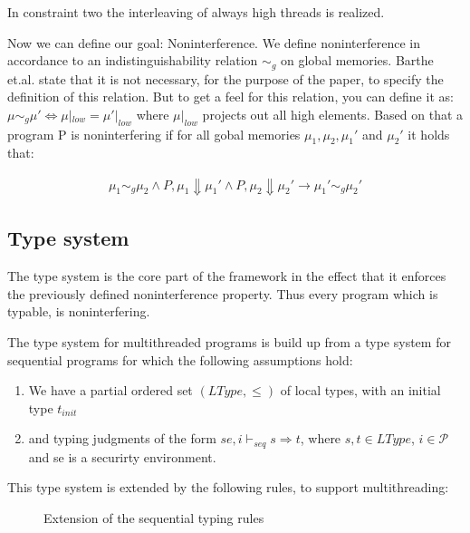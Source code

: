 \documentclass[a4paper,10pt]{llncs}
\begin{document}
In constraint two the interleaving of always high threads is realized.


Now we can define our goal: Noninterference. We define noninterference
in accordance to an indistinguishability relation $\sim_g$ on global memories.
Barthe et.al. state that it is not necessary, for the purpose of the paper,
to specify the definition of this relation. But to get a feel for this
relation, you can define it as: $\mu \sim_g \mu' \Leftrightarrow \mu|_{low} =
\mu'|_{low}$ where $\mu|_{low}$ projects out all high elements. Based on that
a program P is noninterfering if for all gobal memories $\mu_1, \mu_2, \mu_1'$
and $\mu_2'$ it holds that:

\begin{align*}
\mu_1 \sim_g \mu_2 \land P,\mu_1 \Downarrow \mu_1' \land P,\mu_2 \Downarrow \mu_2' \rightarrow \mu_1' \sim_g \mu_2'
\end{align*}

\subsection{Type system}
\label{sec:typesystem}
The type system is the core part of the framework in the effect that it
enforces the previously defined noninterference property. Thus every
program which is typable, is noninterfering.

The type system for multithreaded programs is build up from a type system
for sequential programs for which the following assumptions hold:

\begin{enumerate}
\item We have a partial ordered set $(LType, \leq)$ of local types, with an initial
      type $t_{init}$
\item and typing judgments of the form $se, i \vdash_{seq} s \Rightarrow t$, where
      $s, t \in LType$, $i \in \mathcal{P}$ and se is a securirty environment.
\end{enumerate}

This type system is extended by the following rules, to support multithreading:

\begin{figure}
\begin{prooftree}
\end{prooftree}

\begin{prooftree}
\end{prooftree}
\caption{Extension of the sequential typing rules}
\label{fig:multithreaded-typing-rules}
\end{figure}
\end{document}
